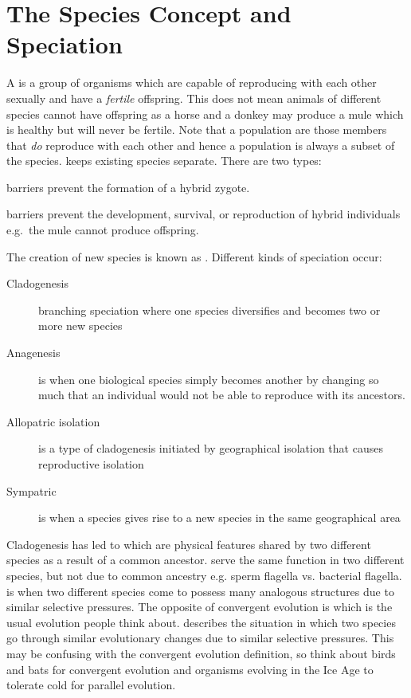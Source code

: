 \documentclass[../Bio_chemistryReview.tex]{subfiles}
\begin{document}
\section{The Species Concept and Speciation}
A  is a group of organisms which are capable of reproducing
with each other sexually and have a \textit{fertile} offspring. This does not
mean animals of different species cannot have offspring as a horse and a donkey
may produce a mule which is healthy but will never be fertile. Note that a
population are those members that \textit{do} reproduce with each other and
hence a population is always a subset of the species.  keeps existing species separate. There are two types:
\begin{description}
  \item {} barriers prevent the
    formation of a hybrid zygote.
  \item {} barriers prevent the
    development, survival, or reproduction of hybrid individuals e.g.\ the
    mule cannot produce offspring.
\end{description}

The creation of new species is known as . Different kinds of
speciation occur:
\begin{description}
  \item[Cladogenesis] branching speciation where one species diversifies and
    becomes two or more new species
  \item[Anagenesis] is when one biological species simply becomes another by
    changing so much that an individual would not be able to reproduce with its
    ancestors.
  \item[Allopatric isolation] is a type of cladogenesis initiated by
    geographical isolation that causes reproductive isolation
  \item[Sympatric] is when a species gives rise to a new species in the same
    geographical area
\end{description}
Cladogenesis has led to  which are physical
features shared by two different species as a result of a common ancestor.
 serve the same function in two different species,
but not due to common ancestry e.g. sperm flagella vs. bacterial flagella.
 is when two different species come to possess
many analogous structures due to similar selective pressures. The opposite of
convergent evolution is  which is the usual
evolution people think about.  describes the
situation in which two species go through similar evolutionary changes due to
similar selective pressures. This may be confusing with the convergent evolution
definition, so think about birds and bats for convergent evolution and organisms
evolving in the Ice Age to tolerate cold for parallel evolution.
\end{document}
